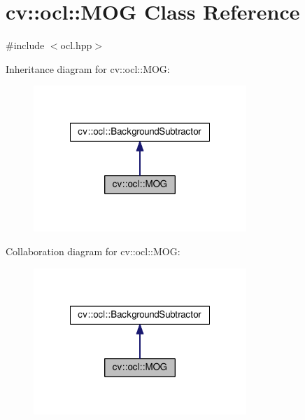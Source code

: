 \hypertarget{classcv_1_1ocl_1_1MOG}{\section{cv\-:\-:ocl\-:\-:M\-O\-G Class Reference}
\label{classcv_1_1ocl_1_1MOG}
}


{\ttfamily \#include $<$ocl.\-hpp$>$}



Inheritance diagram for cv\-:\-:ocl\-:\-:M\-O\-G\-:\nopagebreak
\begin{figure}[H]
\begin{center}
\leavevmode
\includegraphics[width=228pt]{classcv_1_1ocl_1_1MOG__inherit__graph}
\end{center}
\end{figure}


Collaboration diagram for cv\-:\-:ocl\-:\-:M\-O\-G\-:\nopagebreak
\begin{figure}[H]
\begin{center}
\leavevmode
\includegraphics[width=228pt]{classcv_1_1ocl_1_1MOG__coll__graph}
\end{center}
\end{figure}
